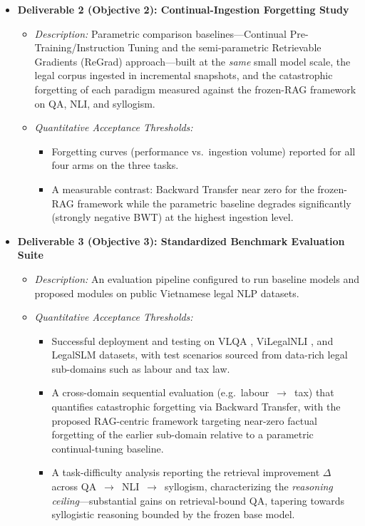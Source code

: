 \begin{itemize}[leftmargin=*]
    \item \textbf{Deliverable 2 (Objective 2): Continual-Ingestion Forgetting Study}
    \begin{itemize}
        \item \textit{Description:} Parametric comparison baselines---Continual Pre-Training/Instruction Tuning and the semi-parametric Retrievable Gradients (ReGrad) approach---built at the \emph{same} small model scale, the legal corpus ingested in incremental snapshots, and the catastrophic forgetting of each paradigm measured against the frozen-RAG framework on QA, NLI, and syllogism.
        \item \textit{Quantitative Acceptance Thresholds:}
        \begin{itemize}
            \item Forgetting curves (performance vs.\ ingestion volume) reported for all four arms on the three tasks.
            \item A measurable contrast: Backward Transfer near zero for the frozen-RAG framework while the parametric baseline degrades significantly (strongly negative BWT) at the highest ingestion level.
        \end{itemize}
    \end{itemize}

    \item \textbf{Deliverable 3 (Objective 3): Standardized Benchmark Evaluation Suite}
    \begin{itemize}
        \item \textit{Description:} An evaluation pipeline configured to run baseline models and proposed modules on public Vietnamese legal NLP datasets.
        \item \textit{Quantitative Acceptance Thresholds:}
        \begin{itemize}
            \item Successful deployment and testing on VLQA \parencite{nguyen2025vlqacomprehensivelargehighquality}, ViLegalNLI \parencite{duong2026vilegalnlinaturallanguageinference}, and LegalSLM \parencite{le-etal-2025-overview} datasets, with test scenarios sourced from data-rich legal sub-domains such as labour and tax law.
            \item A cross-domain sequential evaluation (e.g.\ labour~$\rightarrow$~tax) that quantifies catastrophic forgetting via Backward Transfer, with the proposed RAG-centric framework targeting near-zero factual forgetting of the earlier sub-domain relative to a parametric continual-tuning baseline.
            \item A task-difficulty analysis reporting the retrieval improvement $\Delta$ across QA~$\rightarrow$~NLI~$\rightarrow$~syllogism, characterizing the \emph{reasoning ceiling}---substantial gains on retrieval-bound QA, tapering towards syllogistic reasoning bounded by the frozen base model.
        \end{itemize}
    \end{itemize}
\end{itemize}

